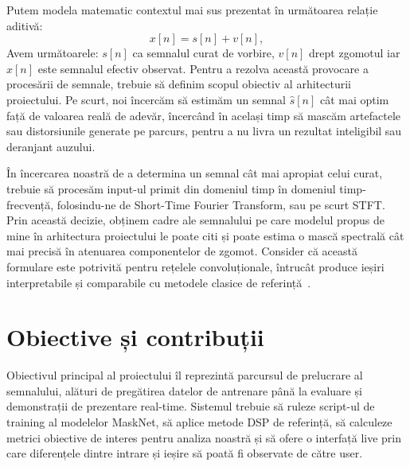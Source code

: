 \documentclass[12pt,a4paper]{report}
\begin{document}
Putem modela matematic contextul mai sus prezentat în următoarea relație aditivă:
\[
x[n] = s[n] + v[n],
\]
Avem următoarele: \(s[n]\) ca semnalul curat de vorbire, \(v[n]\) drept zgomotul iar \(x[n]\) este 
semnalul efectiv observat. Pentru a rezolva această provocare a procesării de semnale,
trebuie să definim scopul obiectiv al arhitecturii proiectului. Pe scurt, noi încercăm 
să estimăm un semnal $\hat{s}[n]$ cât mai optim față de valoarea reală de adevăr, încercând în 
același timp să mascăm artefactele sau distorsiunile generate pe parcurs, pentru a nu 
livra un rezultat inteligibil sau deranjant auzului.

În încercarea noastră de a determina un semnal cât mai apropiat celui curat, trebuie 
să procesăm input-ul primit din domeniul timp în domeniul timp-frecvență, folosindu-ne 
de Short-Time Fourier Transform, sau pe scurt STFT. Prin această decizie, obținem cadre
ale semnalului pe care modelul propus de mine în arhitectura proiectului le poate citi 
și poate estima o mască spectrală cât mai precisă în atenuarea componentelor de zgomot. 
Consider că această formulare este potrivită pentru rețelele convoluționale, întrucât 
produce ieșiri interpretabile și comparabile cu metodele clasice de referință~\cite{stft}.

\section{Obiective și contribuții}

Obiectivul principal al proiectului îl reprezintă parcursul de prelucrare al semnalului, 
alături de pregătirea datelor de antrenare până la evaluare și demonstrații de prezentare real-time. 
Sistemul trebuie să ruleze script-ul de training al modelelor MaskNet, să aplice metode DSP de referință, 
să calculeze metrici obiective de interes pentru analiza noastră și să ofere o interfață live prin care 
diferențele dintre intrare și ieșire să poată fi observate de către user.
\end{document}
